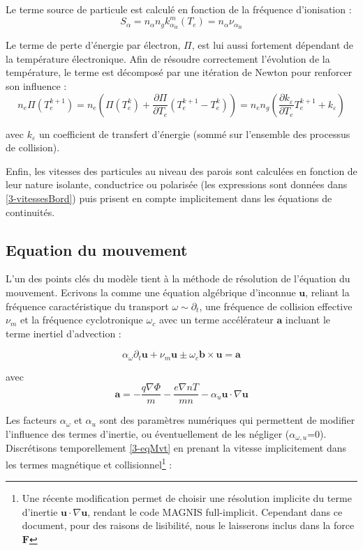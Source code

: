 \begin{refsection}
Le terme source de particule est calculé en fonction de la fréquence
d'ionisation :
\begin{equation*}
S_{\alpha}=n_\alpha n_g k^m_{\alpha_\text{iz}}(T_e)=n_\alpha\nu_{\alpha_\text{iz}}
\end{equation*}

Le terme de perte d'énergie par électron, $\Pi$, est lui aussi fortement
dépendant de la température électronique. Afin de résoudre correctement
l'évolution de la température, le terme est décomposé par une itération
de Newton pour renforcer son influence :
\begin{equation*}
n_e\Pi(T_e^{k+1})=n_e\left(\Pi(T_e^{k})+\frac{\partial\Pi}{\partial
T_e}\left(T_e^{k+1}-T_e^{k}\right)\right)= n_en_g\left(
\frac{\partial k_{\varepsilon}}{\partial T_e}T_e^{k+1}+k_{\varepsilon}\right)
\end{equation*}

avec $k_\varepsilon$ un coefficient de transfert d'énergie (sommé sur 
l'ensemble des processus de collision).

Enfin, les vitesses des particules au niveau des parois sont calculées en
fonction de leur nature isolante, conductrice ou polarisée (les expressions
sont données dans \ref{3-vitessesBord}) puis prisent en compte implicitement
dans les équations de continuités.

\subsection{Equation du mouvement}
L'un des points clés du modèle tient à la méthode de résolution de l'équation du
mouvement. Ecrivons la comme une équation algébrique
d'inconnue $\mathbf u$, reliant la fréquence caractéristique du transport
$\omega\sim\partial_t$, une fréquence de collision effective $\nu_m$ et la
fréquence cyclotronique $\omega_c$ avec un terme
accélérateur $\mathbf a$ incluant le terme inertiel d'advection :

\begin{equation}
\label{3-eqMvt}
\alpha_\omega\partial_t \mathbf{u} + 
\nu_m\mathbf{u}\pm\omega_{c}\mathbf{b}\times\mathbf{u}=
\mathbf a
\end{equation}

avec 
\begin{equation*}\mathbf a=
-\frac{q\nabla \Phi}{m}-\frac{e\nabla
n T}{m
n}-\alpha_u\mathbf{u}\cdot\nabla\mathbf{u}
\end{equation*}

Les facteurs $\alpha_\omega$ et $\alpha_u$ sont des paramètres numériques qui
permettent de modifier l'influence des termes d'inertie, ou éventuellement de
les négliger ($\alpha_{\omega,u}$=0). Discrétisons temporellement
\eqref{3-eqMvt} en prenant la vitesse implicitement dans les termes
magnétique et collisionnel\footnote{Une récente modification permet de choisir
une résolution implicite du terme
d'inertie $\mathbf{u}\cdot\nabla\mathbf{u}$, rendant le code MAGNIS
full-implicit. Cependant dans ce document, pour des raisons de lisibilité, nous
le laisserons inclus dans la force $\mathbf F$} :


\end{refsection}
